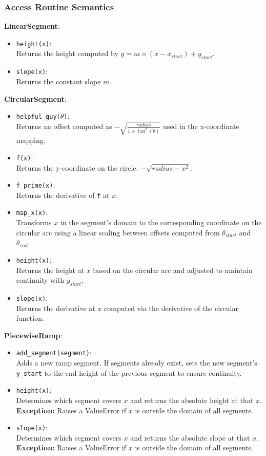 \documentclass[12pt, titlepage]{article}
\begin{document}
\subsubsection{Access Routine Semantics}

\noindent \textbf{LinearSegment}:
\begin{itemize}
  \item \texttt{height(x)}: \\
  Returns the height computed by \( y = m \times (x - x_{start}) + y_{start} \).
  \item \texttt{slope(x)}: \\
  Returns the constant slope \( m \).
\end{itemize}

\noindent \textbf{CircularSegment}:
\begin{itemize}
  \item \texttt{helpful\_guy(\(\theta\))}: \\
  Returns an offset computed as \(-\sqrt{\frac{radius}{1+\tan^2(\theta)}}\) used in the x-coordinate mapping.
  \item \texttt{f(x)}: \\
  Returns the y-coordinate on the circle: \(-\sqrt{radius - x^2}\).
  \item \texttt{f\_prime(x)}: \\
  Returns the derivative of \texttt{f} at \( x \).
  \item \texttt{map\_x(x)}: \\
  Transforms \( x \) in the segment’s domain to the corresponding coordinate on the circular arc using a linear scaling between offsets computed from \(\theta_{start}\) and \(\theta_{end}\).
  \item \texttt{height(x)}: \\
  Returns the height at \( x \) based on the circular arc and adjusted to maintain continuity with \( y_{start} \).
  \item \texttt{slope(x)}: \\
  Returns the derivative at \( x \) computed via the derivative of the circular function.
\end{itemize}

\noindent \textbf{PiecewiseRamp}:
\begin{itemize}
  \item \texttt{add\_segment(segment)}: \\
  Adds a new ramp segment. If segments already exist, sets the new segment's \texttt{y\_start} to the end height of the previous segment to ensure continuity.
  \item \texttt{height(x)}: \\
  Determines which segment covers \( x \) and returns the absolute height at that \( x \). \\
  \textbf{Exception:} Raises a ValueError if \( x \) is outside the domain of all segments.
  \item \texttt{slope(x)}: \\
  Determines which segment covers \( x \) and returns the absolute slope at that \( x \). \\
  \textbf{Exception:} Raises a ValueError if \( x \) is outside the domain of all segments.
\end{itemize}
\end{document}
